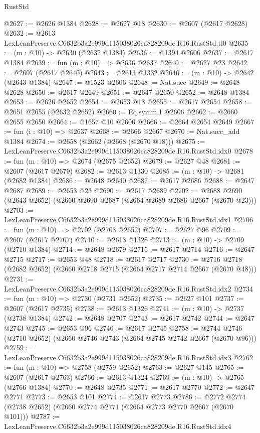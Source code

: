 \begin{lexlean}{RustStd}
\begin{coremodule}
@2627 := @2626 @1384
@2628 := @2627 @18
@2630 := @2607 (@2617 @2628)
@2632 := @2613 LexLeanPreserve.C6632b3a2e999d115038026ca828209de.R16.RustStd.tl0
@2635 := (m : @10) -> @2630 (@2632 @1384)
@2636 := @1394 @2606
@2637 := @2617 @1384
@2639 := fun (m : @10) => @2636 @2637
@2640 := @2627 @23
@2642 := @2607 (@2617 @2640)
@2643 := @2613 @1332
@2646 := (m : @10) -> @2642 (@2643 @1384)
@2647 := @1523 @2606
@2648 := Nat.succ
@2649 := @2648 @2628
@2650 := @2617 @2649
@2651 := @2647 @2650
@2652 := @2648 @1384
@2653 := @2626 @2652
@2654 := @2653 @18
@2655 := @2617 @2654
@2658 := @2651 @2655 (@2632 @2652)
@2660 := Eq.symm.{1} @2606
@2662 := @2660 @2655 @2650
@2664 := @1657 @10 @2606
@2666 := @2664 @2654 @2649
@2667 := fun (i : @10) => @2637
@2668 := @2666 @2667
@2670 := Nat.succ_add @1384
@2674 := @2658 (@2662 (@2668 (@2670 @18)))
@2675 := LexLeanPreserve.C6632b3a2e999d115038026ca828209de.R16.RustStd.idx0
@2678 := fun (m : @10) => @2674 (@2675 @2652)
@2679 := @2627 @48
@2681 := @2607 (@2617 @2679)
@2682 := @2613 @1330
@2685 := (m : @10) -> @2681 (@2682 @1384)
@2686 := @2648 @2640
@2687 := @2617 @2686
@2688 := @2647 @2687
@2689 := @2653 @23
@2690 := @2617 @2689
@2702 := @2688 @2690 (@2643 @2652) (@2660 @2690 @2687 (@2664 @2689 @2686 @2667 (@2670 @23)))
@2703 := LexLeanPreserve.C6632b3a2e999d115038026ca828209de.R16.RustStd.idx1
@2706 := fun (m : @10) => @2702 (@2703 @2652)
@2707 := @2627 @96
@2709 := @2607 (@2617 @2707)
@2710 := @2613 @1328
@2713 := (m : @10) -> @2709 (@2710 @1384)
@2714 := @2648 @2679
@2715 := @2617 @2714
@2716 := @2647 @2715
@2717 := @2653 @48
@2718 := @2617 @2717
@2730 := @2716 @2718 (@2682 @2652) (@2660 @2718 @2715 (@2664 @2717 @2714 @2667 (@2670 @48)))
@2731 := LexLeanPreserve.C6632b3a2e999d115038026ca828209de.R16.RustStd.idx2
@2734 := fun (m : @10) => @2730 (@2731 @2652)
@2735 := @2627 @101
@2737 := @2607 (@2617 @2735)
@2738 := @2613 @1326
@2741 := (m : @10) -> @2737 (@2738 @1384)
@2742 := @2648 @2707
@2743 := @2617 @2742
@2744 := @2647 @2743
@2745 := @2653 @96
@2746 := @2617 @2745
@2758 := @2744 @2746 (@2710 @2652) (@2660 @2746 @2743 (@2664 @2745 @2742 @2667 (@2670 @96)))
@2759 := LexLeanPreserve.C6632b3a2e999d115038026ca828209de.R16.RustStd.idx3
@2762 := fun (m : @10) => @2758 (@2759 @2652)
@2763 := @2627 @145
@2765 := @2607 (@2617 @2763)
@2766 := @2613 @1324
@2769 := (m : @10) -> @2765 (@2766 @1384)
@2770 := @2648 @2735
@2771 := @2617 @2770
@2772 := @2647 @2771
@2773 := @2653 @101
@2774 := @2617 @2773
@2786 := @2772 @2774 (@2738 @2652) (@2660 @2774 @2771 (@2664 @2773 @2770 @2667 (@2670 @101)))
@2787 := LexLeanPreserve.C6632b3a2e999d115038026ca828209de.R16.RustStd.idx4

\end{coremodule}
\end{lexlean}
